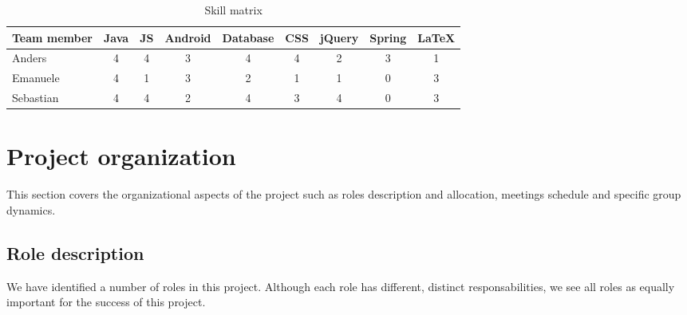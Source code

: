 \begin{table}[h]
\begin{center}
\begin{tabular}{ | l | c | c | c | c | c | c | c | c | }
  \hline
  Team member & Java & JS & Android & Database & CSS & jQuery & Spring & LaTeX \\
  \hline\noalign{\smallskip}\hline
  Anders & 4 & 4 & 3 & 4 & 4 & 2 & 3 & 1 \\
  Emanuele & 4 & 1 & 3 & 2 & 1 & 1 & 0 & 3 \\
  Sebastian & 4 & 4 & 2 & 4 & 3 & 4 & 0 & 3 \\
  \hline
\end{tabular}
\end{center}
\caption{Skill matrix}
\label{table:skillmatrix}
\end{table}

\newpage
\section{Project organization}
\label{section:organization}

This section covers the organizational aspects of the project such as roles description and allocation,
meetings schedule and specific group dynamics.

\subsection{Role description}
We have identified a number of roles in this project. Although each role has different, distinct responsabilities,
we see all roles as equally important for the success of this project.


